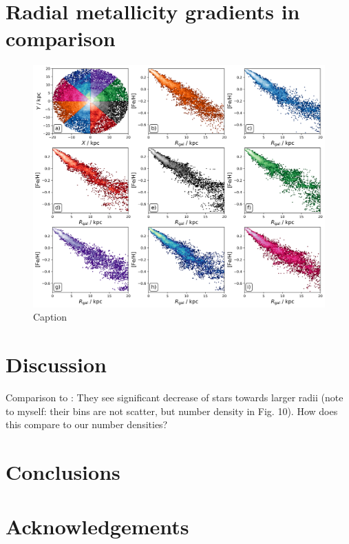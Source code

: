 \documentclass[fleqn,usenatbib]{mnras}
\begin{document}
\section{Radial metallicity gradients in comparison}
\label{sec:radial_metallicity_gradient_comparison}

\begin{figure}
    \centering
    \includegraphics[width=\textwidth]{figures/radial_metallicity_gradients_mw_in_angles.png}
    \caption{Caption}
    \label{fig:enter-label}
\end{figure}


\section{Discussion} \label{sec:discussion}

Comparison to \citet[][see their Fig. 10]{Minchev2014b}: They see significant decrease of stars towards larger radii (note to myself: their bins are not scatter, but number density in Fig. 10). How does this compare to our number densities?


\section{Conclusions}
\label{sec:conc}


\section*{Acknowledgements}
\end{document}
